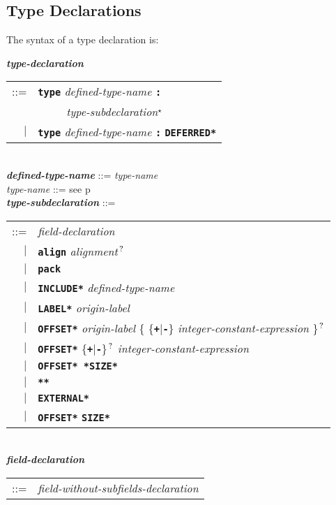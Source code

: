 \documentclass[12pt]{article}
\newcommand{\TT}[1]{{\tt \bfseries #1}}
\newcommand{\STAR}{{\Large $^\star$}}
\newcommand{\QMARK}{{$^{\,\mbox{\footnotesize ?}}$}}
\newcommand{\ttkey}[1]{{\tt \bfseries #1}}
\newcommand{\emkey}[1]{{\em \bfseries #1}}
\newcommand{\pagref}[1]{p\pageref{#1}}
\newenvironment{indpar}[1][0.3in]%
	{\begin{list}{}%
		     {\setlength{\itemsep}{0in}%
		      \setlength{\topsep}{0in}%
		      \setlength{\parsep}{1ex}%
		      \setlength{\labelwidth}{#1}%
		      \setlength{\leftmargin}{#1}%
		      \addtolength{\leftmargin}{\labelsep}}%
	 \item}%
	{\end{list}}
\begin{document}
\subsection{Type Declarations}
\label{TYPE-DECLARATIONS}

The syntax of a type declaration is:

\begin{indpar}
\emkey{type-declaration}\label{TYPE-DECLARATION}
    \begin{tabular}[t]{rl}
    ::= & \ttkey{type} {\em defined-type-name} \TT{:} \\
	& \TT{~~~~~}{\em type-subdeclaration}\STAR{} \\
    $|$ & \ttkey{type} {\em defined-type-name} \TT{:} \ttkey{*DEFERRED*} \\
    \end{tabular} \\
\emkey{defined-type-name} ::= {\em type-name} \\
{\em type-name} ::= see \pagref{TYPE-NAME}
\\[2ex]
\emkey{type-subdeclaration} ::= \\
\hspace*{0.5in}%
    \begin{tabular}[t]{@{}rl}
    ::= &  {\em field-declaration} \\
    $|$ &  \ttkey{align} {\em alignment}\QMARK{} \\
    $|$ &  \ttkey{pack} \\
    $|$ &  \ttkey{*INCLUDE*} {\em defined-type-name} \\
    $|$ &  \ttkey{*LABEL*} {\em origin-label} \\
    $|$ &  \ttkey{*OFFSET*} {\em origin-label} \{ \{\TT{+}|\TT{-}\}
                            {\em integer-constant-expression} \}\QMARK{} \\
    $|$ &  \ttkey{*OFFSET*} \{\TT{+}|\TT{-}\}\QMARK{}
                            {\em integer-constant-expression} \\
    $|$ &  \ttkey{*OFFSET* *SIZE*} \\
    $|$ &  \ttkey{***} \\
    $|$ &  \ttkey{*EXTERNAL*} \\
    $|$ &  \ttkey{*OFFSET*} \ttkey{*SIZE*} \\
    \end{tabular}
\\[2ex]
\emkey{field-declaration}\label{FIELD-DECLARATION}
    \begin{tabular}[t]{@{}rl}
    ::= &  {\em field-without-subfields-declaration} \\

\end{tabular}
\end{indpar}
\end{document}
